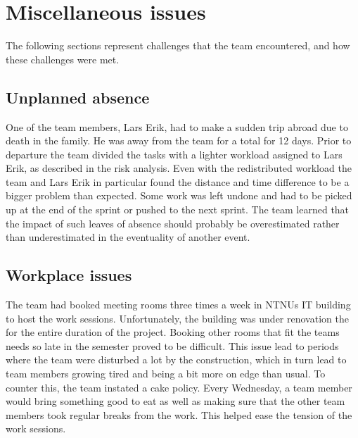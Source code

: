 \section{Miscellaneous issues}
The following sections represent challenges that the team encountered, and how these challenges were met.

\subsection{Unplanned absence}
One of the team members, Lars Erik, had to make a sudden trip abroad due to
death in the family. He was away from the team for a total for 12 days. Prior
to departure the team divided the tasks with a lighter workload assigned to Lars
Erik, as described in the risk analysis. Even with the redistributed workload
the team and Lars Erik in particular found the distance and time difference to
be a bigger problem than expected. Some work was left undone and had to be
picked up at the end of the sprint or pushed to the next sprint. The team
learned that the impact of such leaves of absence should probably be
overestimated rather than underestimated in the eventuality of another event.

\subsection{Workplace issues}
The team had booked meeting rooms three times a week in NTNUs IT building to host the work sessions. Unfortunately, the building was under renovation the for the entire duration of the project. Booking other rooms that fit the teams needs so late in the semester proved to be difficult. This issue lead to periods where the team were disturbed a lot by the construction, which in turn lead to team members growing tired and being a bit more on edge than usual. To counter this, the team instated a cake policy. Every Wednesday, a team member would bring something good to eat as well as making sure that the other team members took regular breaks from the work. This helped ease the tension of the work sessions.

\begin{comment}
\subsection{Excessive discussion}
The team has seen that much time is being spent discussing a lot. The discussion was of importance, but it drained too much of the time. To solve this, it was decided that there should be set a certain amount of time for the discussions. Should the discussions last longer than the time set, the project leader's task was to focus on ending the discussions, and instead perform a democratic vote based on the arguments that were presented. 
\end{comment}


